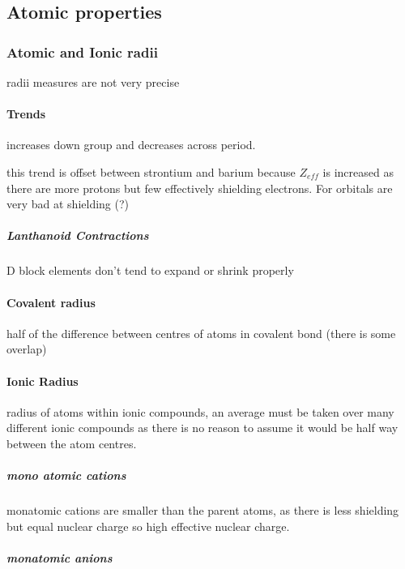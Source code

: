 \documentclass[]{article}
\let\oldparagraph\paragraph
\renewcommand{\paragraph}[1]{\oldparagraph{#1}\mbox{}}
\let\oldsubparagraph\subparagraph
\renewcommand{\subparagraph}[1]{\oldsubparagraph{#1}\mbox{}}
\begin{document}
\subsection{Atomic properties}\label{atomic-properties}

\subsubsection{Atomic and Ionic radii}\label{atomic-and-ionic-radii}

radii measures are not very precise

\paragraph{Trends}\label{trends-1}

increases down group and decreases across period.

this trend is offset between strontium and barium because \(Z_{eff}\) is
increased as there are more protons but few effectively shielding
electrons. For orbitals are very bad at shielding (?)

\subparagraph{Lanthanoid Contractions}\label{lanthanoid-contractions}

D block elements don't tend to expand or shrink properly

\paragraph{Covalent radius}\label{covalent-radius}

half of the difference between centres of atoms in covalent bond (there
is some overlap)

\paragraph{Ionic Radius}\label{ionic-radius}

radius of atoms within ionic compounds, an average must be taken over
many different ionic compounds as there is no reason to assume it would
be half way between the atom centres.

\subparagraph{mono atomic cations}\label{mono-atomic-cations}

monatomic cations are smaller than the parent atoms, as there is less
shielding but equal nuclear charge so high effective nuclear charge.

\subparagraph{monatomic anions}\label{monatomic-anions}
\end{document}
